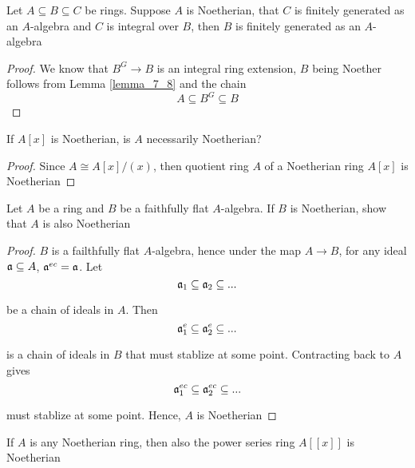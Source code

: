 \begin{lemma}
	\label{lemma_7_8}
	Let $A \subseteq B \subseteq C$ be rings. Suppose $A$ is Noetherian, that $C$ is finitely generated as an $A$-algebra and $C$ is integral over $B$, then $B$ is finitely generated as an $A$-algebra
\end{lemma}

\begin{proof}
	We know that $B^G \to B$ is an integral ring extension, $B$ being Noether follows from Lemma \ref{lemma_7_8}  and the chain
	$$
		A \subseteq B^G \subseteq B
	$$
\end{proof}

\begin{problem}
	If $A[x]$ is Noetherian, is $A$ necessarily Noetherian?
\end{problem}

\begin{proof}
	Since $A \cong A[x] / (x)$, then quotient ring $A$ of a Noetherian ring $A[x]$ is Noetherian
\end{proof}

\begin{problem}
	Let $A$ be a ring and $B$ be a faithfully flat $A$-algebra. If $B$ is Noetherian, show that $A$ is also Noetherian
\end{problem}

\begin{proof}
	$B$ is a failthfully flat $A$-algebra, hence under the map $A \to B$, for any ideal $\mathfrak{a} \subseteq A$, $\mathfrak{a}^{ec} = \mathfrak{a}$. Let 
	$$
		\mathfrak{a}_1 \subseteq \mathfrak{a}_2 \subseteq ...
	$$
	
	be a chain of ideals in $A$. Then
	$$
		\mathfrak{a}_1^e \subseteq \mathfrak{a}_2^e \subseteq ...
	$$
	
	is a chain of ideals in $B$ that must stablize at some point. Contracting back to $A$ gives
	$$
		\mathfrak{a}_1^{ec} \subseteq \mathfrak{a}_2^{ec} \subseteq ...
	$$
	
	must stablize at some point. Hence, $A$ is Noetherian
\end{proof}

\begin{problem}
	If $A$ is any Noetherian ring, then also the power series ring $A[[x]]$ is Noetherian
\end{problem}

